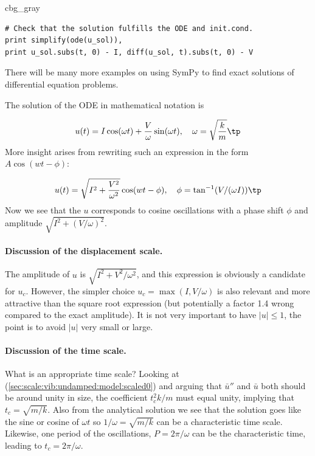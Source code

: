 \documentclass[graybox,envcountchap,sectrefs,final]{svmonodo}
\newenvironment{_cod_tight}[1]{
   \def\FrameCommand{\colorbox{#1}}
   \FrameRule0.6pt\MakeFramed {\FrameRestore}\vskip3mm}
   {\vskip0mm\endMakeFramed}
\newenvironment{cod}[1]{
\bgroup\rmfamily
\fboxsep=0mm\relax
\begin{_cod_tight}{#1}
\list{}{\parsep=-2mm\parskip=0mm\topsep=0pt\leftmargin=2mm
\rightmargin=2\leftmargin\leftmargin=4pt\relax}
\item\relax}
{\endlist\end{_cod_tight}\egroup}
\begin{document}
\begin{cod}{cbg_gray}\begin{Verbatim}[numbers=none,fontsize=\fontsize{9pt}{9pt},baselinestretch=0.95,xleftmargin=2mm]
# Check that the solution fulfills the ODE and init.cond.
print simplify(ode(u_sol)),
print u_sol.subs(t, 0) - I, diff(u_sol, t).subs(t, 0) - V
\end{Verbatim}
\end{cod}
\noindent
There will be many more examples on using SymPy to find exact solutions
of differential equation problems.

The solution of the ODE in mathematical notation is

\[ u(t) = I\cos(\omega t) + \frac{V}{\omega}\sin(\omega t),\quad \omega = \sqrt{\frac{k}{m}}\tp\]
More insight arises from rewriting such an expression in the form
$A\cos(wt - \phi)$:

\[ u(t) = \sqrt{I^2 + \frac{V^2}{\omega^2}}\cos(wt - \phi),\quad
\phi = \tan^{-1}(V/(\omega I))\tp
\]
Now we see that the $u$ corresponds to cosine oscillations with a
phase shift $\phi$ and amplitude $\sqrt{I^2 + (V/\omega)^2}$.

\paragraph{Discussion of the displacement scale.}
The amplitude of $u$ is $\sqrt{I^2 + V^2/\omega^2}$, and this
expression is obviously a candidate for $u_c$.  However, the simpler
choice $u_c=\max (I, V/\omega)$ is also relevant and more attractive
than the square root expression (but potentially a factor 1.4 wrong
compared to the exact amplitude).  It is not very important to have
$|u|\leq 1$, the point is to avoid $|u|$ very small or large.

\paragraph{Discussion of the time scale.}
What is an appropriate time scale? Looking at
(\ref{sec:scale:vib:undamped:model:scaled0}) and arguing that
$\bar u''$ and $\bar u$ both should be around unity in size, the
coefficient $t_c^2k/m$ must equal unity, implying that $t_c=\sqrt{m/k}$.
Also from the analytical solution we see that the solution goes like the
sine or cosine of $\omega t$ so $1/\omega = \sqrt{m/k}$ can be a characteristic
time scale. Likewise, one period of the oscillations, $P=2\pi/\omega$ can
be the characteristic time, leading to $t_c=2\pi/\omega$.
\end{document}
